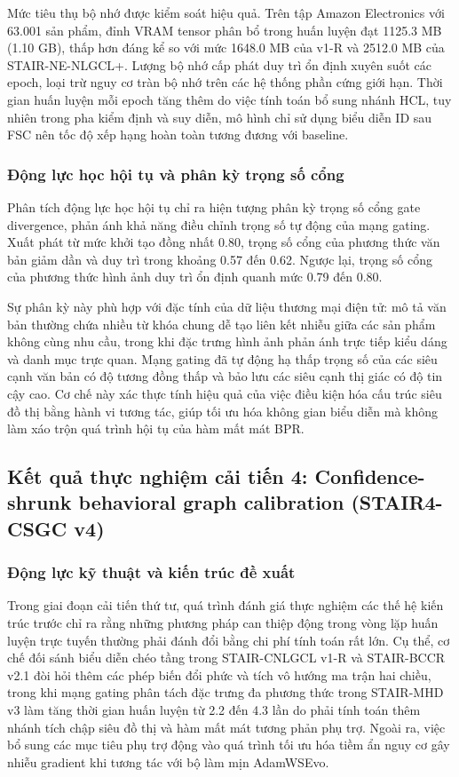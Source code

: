 Mức tiêu thụ bộ nhớ được kiểm soát hiệu quả. Trên tập Amazon Electronics với 63.001 sản phẩm, đỉnh VRAM tensor phân bổ trong huấn luyện đạt 1125.3 MB (1.10 GB), thấp hơn đáng kể so với mức 1648.0 MB của v1-R và 2512.0 MB của STAIR-NE-NLGCL+. Lượng bộ nhớ cấp phát duy trì ổn định xuyên suốt các epoch, loại trừ nguy cơ tràn bộ nhớ trên các hệ thống phần cứng giới hạn. Thời gian huấn luyện mỗi epoch tăng thêm do việc tính toán bổ sung nhánh HCL, tuy nhiên trong pha kiểm định và suy diễn, mô hình chỉ sử dụng biểu diễn ID sau FSC nên tốc độ xếp hạng hoàn toàn tương đương với baseline.

\subsubsection{Động lực học hội tụ và phân kỳ trọng số cổng}

Phân tích động lực học hội tụ chỉ ra hiện tượng phân kỳ trọng số cổng gate divergence, phản ánh khả năng điều chỉnh trọng số tự động của mạng gating. Xuất phát từ mức khởi tạo đồng nhất 0.80, trọng số cổng của phương thức văn bản giảm dần và duy trì trong khoảng 0.57 đến 0.62. Ngược lại, trọng số cổng của phương thức hình ảnh duy trì ổn định quanh mức 0.79 đến 0.80.

Sự phân kỳ này phù hợp với đặc tính của dữ liệu thương mại điện tử: mô tả văn bản thường chứa nhiều từ khóa chung dễ tạo liên kết nhiễu giữa các sản phẩm không cùng nhu cầu, trong khi đặc trưng hình ảnh phản ánh trực tiếp kiểu dáng và danh mục trực quan. Mạng gating đã tự động hạ thấp trọng số của các siêu cạnh văn bản có độ tương đồng thấp và bảo lưu các siêu cạnh thị giác có độ tin cậy cao. Cơ chế này xác thực tính hiệu quả của việc điều kiện hóa cấu trúc siêu đồ thị bằng hành vi tương tác, giúp tối ưu hóa không gian biểu diễn mà không làm xáo trộn quá trình hội tụ của hàm mất mát BPR.

\subsection{Kết quả thực nghiệm cải tiến 4: Confidence-shrunk behavioral graph calibration (STAIR4-CSGC v4)}
\label{sec:stair_csgc_v4}

\subsubsection{Động lực kỹ thuật và kiến trúc đề xuất}

Trong giai đoạn cải tiến thứ tư, quá trình đánh giá thực nghiệm các thế hệ kiến trúc trước chỉ ra rằng những phương pháp can thiệp động trong vòng lặp huấn luyện trực tuyến thường phải đánh đổi bằng chi phí tính toán rất lớn. Cụ thể, cơ chế đối sánh biểu diễn chéo tầng trong STAIR-CNLGCL v1-R và STAIR-BCCR v2.1 đòi hỏi thêm các phép biến đổi phức và tích vô hướng ma trận hai chiều, trong khi mạng gating phân tách đặc trưng đa phương thức trong STAIR-MHD v3 làm tăng thời gian huấn luyện từ 2.2 đến 4.3 lần do phải tính toán thêm nhánh tích chập siêu đồ thị và hàm mất mát tương phản phụ trợ. Ngoài ra, việc bổ sung các mục tiêu phụ trợ động vào quá trình tối ưu hóa tiềm ẩn nguy cơ gây nhiễu gradient khi tương tác với bộ làm mịn AdamWSEvo.

